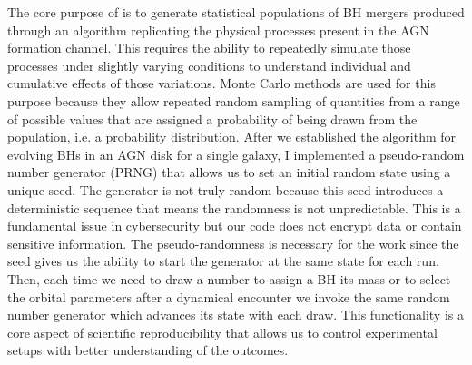 The core purpose of \mcfacts is to generate statistical populations of BH mergers produced through an algorithm replicating the physical processes present in the AGN formation channel.
This requires the ability to repeatedly simulate those processes under slightly varying conditions to understand individual and cumulative effects of those variations.
Monte Carlo methods are used for this purpose because they allow repeated random sampling of quantities from a range of possible values that are assigned a probability of being drawn from the population, i.e. a probability distribution.
After we established the algorithm for evolving BHs in an AGN disk for a single galaxy, I implemented a pseudo-random number generator (PRNG) that allows us to set an initial random state using a unique seed.
The generator is not truly random because this seed introduces a deterministic sequence that means the randomness is not unpredictable.
This is a fundamental issue in cybersecurity but our code does not encrypt data or contain sensitive information.
The pseudo-randomness is necessary for the work since the seed gives us the ability to start the generator at the same state for each run. 
Then, each time we need to draw a number to assign a BH its mass or to select the orbital parameters after a dynamical encounter we invoke the same random number generator which advances its state with each draw.
This functionality is a core aspect of scientific reproducibility that allows us to control experimental setups with better understanding of the outcomes.

